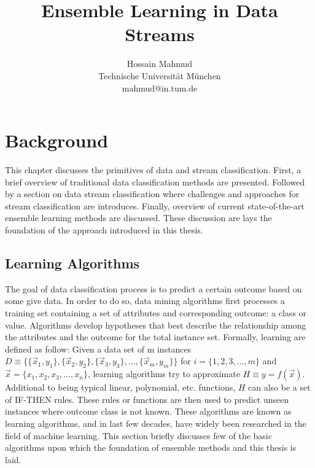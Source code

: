 \documentclass[a4paper, 11pt, oneside]{book}
\begin{document}
\title{Ensemble Learning in Data Streams}


\author{
Hossain Mahmud \\
Technische Universit\"at M\"unchen\\
mahmud@in.tum.de
}

\date{}

%
%
%

\onehalfspacing
{}
\setcounter{page}{1}



\chapter{Background}
\label{chp:background}
This chapter discusses the primitives of data and stream classification. First, a brief overview of traditional data classification methods are presented. Followed by a section on data stream classification where challenges and approaches for stream classification are introduces. Finally, overview of current state-of-the-art ensemble learning methods are discussed. These discussion are lays the foundation of the approach introduced in this thesis.


\section{Learning Algorithms}
The goal of data classification process is to predict a certain outcome based on some give data. In order to do so, data mining algorithms first processes a training set containing a set of attributes and corresponding outcome: a class or value. Algorithms develop hypotheses that best describe the relationship among the attributes and the outcome for the total instance set. 
Formally, learning are defined as follow: Given a data set of m instances 
$D \equiv \{ \{\vec{x}_1, y_1\}, \{\vec{x}_2, y_2\}, \{\vec{x}_3, y_3\}, \dots, \{\vec{x}_m, y_m\} \}$ 
for $i = \{ 1, 2, 3, \dots, m \}$ and $ \vec{x} = \{x_1, x_2, x_3, \dots, x_n\}$, 
learning algorithms try to approximate $H \equiv y = f(\vec{x})$. 
Additional to being typical linear, polynomial, etc. functions, $H$ can also be a set of IF-THEN rules. 
These rules or functions are then used to predict unseen instances where outcome class is not known. These algorithms are known as learning algorithms, and in last few decades, have widely been researched in the field of machine learning. This section briefly discusses few of the basic algorithms upon which the foundation of ensemble methods and this thesis is laid. 
\end{document}
